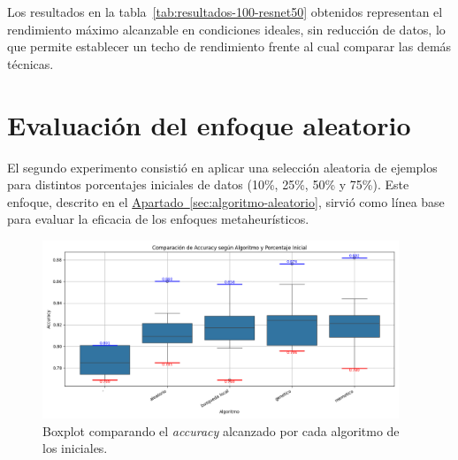 \begin{table}[htp]
    \centering
    \caption{Resultados de ResNet50 entrenado con el 100\% del conjunto de datos.}
    \label{tab:resultados-100-resnet50}
\end{table}

Los resultados en la tabla~\ref{tab:resultados-100-resnet50} obtenidos representan el rendimiento máximo alcanzable en condiciones ideales,
sin reducción de datos, lo que permite establecer un techo de rendimiento frente al cual comparar las demás técnicas.


\section{Evaluación del enfoque aleatorio}\label{sec:evaluacion-enfoque-aleatorio}
El segundo experimento consistió en aplicar una selección aleatoria de ejemplos para distintos porcentajes iniciales de datos (10\%, 25\%, 50\% y 75\%).
Este enfoque, descrito en el \hyperref[sec:algoritmo-aleatorio]{Apartado~\ref*{sec:algoritmo-aleatorio}}, sirvió como línea base para evaluar la eficacia de los enfoques metaheurísticos.

\begin{figure}[!h]
    \centering
    \includegraphics[width=0.95\textwidth]{imagenes/mobilenet-BOXPLOT-generacion-inicial}
    \caption{Boxplot comparando el \textit{accuracy} alcanzado por cada algoritmo de los iniciales.}
    \label{fig:resnet-boxplot-generacion-inicial}
\end{figure}

